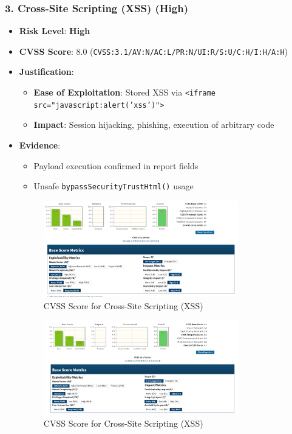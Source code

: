 \documentclass[12pt]{article}
\begin{document}
\subsubsection*{3. Cross-Site Scripting (XSS) (High)}
\begin{itemize}
    \item \textbf{Risk Level}: \textcolor{high}{\textbf{High}}
    \item \textbf{CVSS Score}: 8.0 (\texttt{CVSS:3.1/AV:N/AC:L/PR:N/UI:R/S:U/C:H/I:H/A:H})
    \item \textbf{Justification}:
    \begin{itemize}
        \item \textbf{Ease of Exploitation}: Stored XSS via \texttt{<iframe src="javascript:alert('xss')">}
        \item \textbf{Impact}: Session hijacking, phishing, execution of arbitrary code \end{itemize}
    \item \textbf{Evidence}:
    \begin{itemize}
        \item Payload execution confirmed in report fields
        \item Unsafe \texttt{bypassSecurityTrustHtml()} usage
    \end{itemize}
    \begin{figure}[h!]
    \centering
    \includegraphics[width=0.8\textwidth]{RA3.png}
    \caption{CVSS Score for Cross-Site Scripting (XSS) }
    \label{fig:sql_injection}
    \end{figure}
     \begin{figure}[h!]
    \centering
    \includegraphics[width=0.8\textwidth]{RA33.png}
    \caption{CVSS Score for Cross-Site Scripting (XSS) }
    \label{fig:sql_injection}
    \end{figure}
    \FloatBarrier
    \end{itemize}
\end{document}
